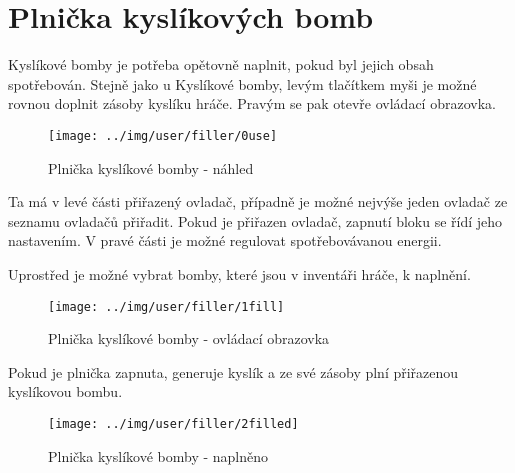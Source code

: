 
\section{Plnička kyslíkových bomb}

Kyslíkové bomby je potřeba opětovně naplnit, pokud byl jejich obsah spotřebován. Stejně jako u Kyslíkové bomby, levým tlačítkem myši je možné rovnou doplnit zásoby kyslíku hráče. Pravým se pak otevře ovládací obrazovka.

\begin{figure}[!ht]\centering
\texttt{[image: ../img/user/filler/0use]}

\caption{Plnička kyslíkové bomby - náhled}
\label{fig:user_filler_0use}

\end{figure}

\FloatBarrier

Ta má v levé části přiřazený ovladač, případně je možné nejvýše jeden ovladač ze seznamu ovladačů přiřadit. Pokud je přiřazen ovladač, zapnutí bloku se řídí jeho nastavením. V pravé části je možné regulovat spotřebovávanou energii.

Uprostřed je možné vybrat bomby, které jsou v inventáři hráče, k naplnění.

\begin{figure}[!ht]\centering
\texttt{[image: ../img/user/filler/1fill]}

\caption{Plnička kyslíkové bomby - ovládací obrazovka}
\label{fig:user_filler_1fill}

\end{figure}

\FloatBarrier

Pokud je plnička zapnuta, generuje kyslík a ze své zásoby plní přiřazenou kyslíkovou bombu.

\begin{figure}[!ht]\centering
\texttt{[image: ../img/user/filler/2filled]}

\caption{Plnička kyslíkové bomby - naplněno}
\label{fig:user_filler_2filled}

\end{figure}



\FloatBarrier